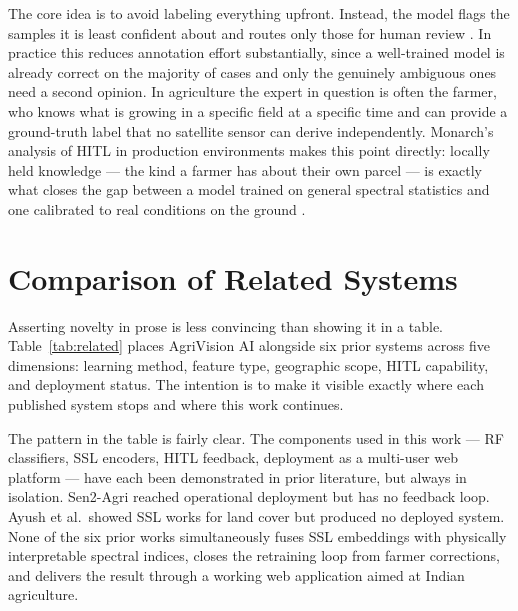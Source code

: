 \documentclass[12pt,a4paper,oneside]{report}
\begin{document}
The core idea is to avoid labeling everything upfront. Instead, the model flags the
samples it is least confident about and routes only those for human review
\cite{settles2009active}. In practice this reduces annotation effort substantially,
since a well-trained model is already correct on the majority of cases and only the
genuinely ambiguous ones need a second opinion. In agriculture the expert in question
is often the farmer, who knows what is growing in a specific field at a specific time
and can provide a ground-truth label that no satellite sensor can derive independently.
Monarch's analysis of HITL in production environments makes this point directly:
locally held knowledge — the kind a farmer has about their own parcel — is exactly
what closes the gap between a model trained on general spectral statistics and one
calibrated to real conditions on the ground \cite{monarch2021hitl}.

\section{Comparison of Related Systems}

Asserting novelty in prose is less convincing than showing it in a table. Table~\ref{tab:related} places AgriVision AI alongside six prior systems across five dimensions: learning method, feature type, geographic scope, HITL capability, and deployment status. The intention is to make it visible exactly where each published system stops and where this work continues.

The pattern in the table is fairly clear. The components used in this work — RF
classifiers, SSL encoders, HITL feedback, deployment as a multi-user web platform —
have each been demonstrated in prior literature, but always in isolation. Sen2-Agri
reached operational deployment but has no feedback loop. Ayush et al.\ showed SSL
works for land cover but produced no deployed system. None of the six prior works
simultaneously fuses SSL embeddings with physically interpretable spectral indices,
closes the retraining loop from farmer corrections, and delivers the result through
a working web application aimed at Indian agriculture.
\end{document}
